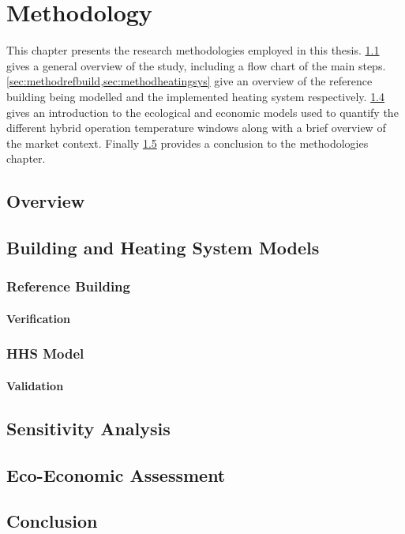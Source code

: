 \chapter{Methodology}\label{ch:method} 

This chapter presents the research methodologies employed in this thesis. \cref{sec:methodoverview} gives a general overview of the study, including a flow chart of the main steps. \cref{sec:methodrefbuild,sec:methodheatingsys} give an overview of the reference building being modelled and the implemented heating system respectively. \cref{sec:methodecoeco} gives an introduction to the ecological and economic models used to quantify the different hybrid operation temperature windows along with a brief overview of the market context. Finally \cref{sec:methodconclusion} provides a conclusion to the methodologies chapter.

\section{Overview} \label{sec:methodoverview}




\section{Building and Heating System Models}
\subsection{Reference Building}\label{sec:methodrefbuild}

\subsubsection{Verification}
\subsection{\acs{HHS} Model}\label{sec:methodheatingsys}
\subsubsection{Validation}

\section{Sensitivity Analysis}

\section{Eco-Economic Assessment}\label{sec:methodecoeco}

\section{Conclusion}\label{sec:methodconclusion}


